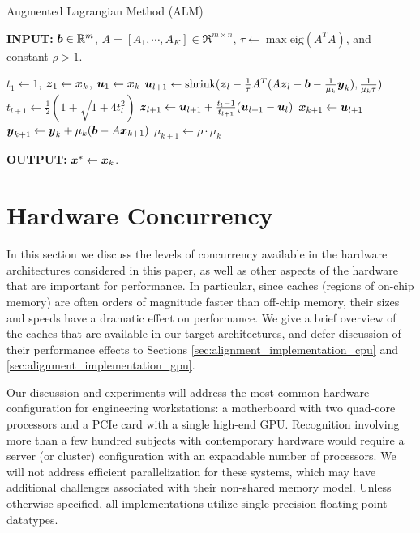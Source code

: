 \documentclass[preprint]{sigplanconf}
\begin{document}
 \begin{algorithm}[h]
\caption{Augmented Lagrangian Method (ALM)}
\small
{\bf INPUT:} ${\boldsymbol{b}} \in {\mathbb{R}}^m$, $A=[A_1,\cdots, A_K] \in \Re^{m \times n}$, $\tau\leftarrow \max\mbox{eig}(A^TA)$, and constant $\rho>1$.
\begin{algorithmic}[1]
\STATE $t_1 \leftarrow 1$, ${\boldsymbol{z}}_1 \leftarrow {\boldsymbol{x}}_k$, ${\boldsymbol{u}}_1 \leftarrow {\boldsymbol{x}}_k$ 
\STATE ${\boldsymbol{u}}_{l+1}  \leftarrow {\text{shrink}}({\boldsymbol{z}}_l - \frac{1}{\tau}A^T(A{\boldsymbol{z}}_l - {\boldsymbol{b}} - \frac{1}{\mu_k}{\boldsymbol{y}}_k), \frac{1}{\mu_k\tau})$
\STATE $t_{l+1} \leftarrow \frac{1}{2}( 1 + \sqrt{1+4t_l^2})$
\STATE ${\boldsymbol{z}}_{l+1} \leftarrow {\boldsymbol{u}}_{l+1}+ \frac{t_l - 1}{t_{l+1}}({\boldsymbol{u}}_{l+1} - {\boldsymbol{u}}_l)$ 
\ENDWHILE 
\STATE ${\boldsymbol{x}}_{k+1} \leftarrow {\boldsymbol{u}}_{l+1}$ 
\STATE ${\boldsymbol{y}}_{k+1} \leftarrow {\boldsymbol{y}}_k + \mu_k ({\boldsymbol{b}} - A{\boldsymbol{x}}_{k+1})$ 
\STATE $\mu_{k+1} \leftarrow \rho\cdot\mu_k$ 
\ENDWHILE 
\end{algorithmic}

{\bf OUTPUT:} ${\boldsymbol{x}}^* \leftarrow {\boldsymbol{x}}_k$.
\label{alg:alm} 
\end{algorithm}

\vspace{-0.06in}
\section{Hardware Concurrency} \label{sec:concurrency}
\vspace{-0.06in}
In this section we discuss the levels of concurrency available in the hardware
architectures considered in this paper, as well as other aspects of the
hardware that are important for performance.  In particular, since caches
(regions of on-chip memory) are often orders of magnitude faster than off-chip
memory, their sizes and speeds have a dramatic effect on performance.  We give a
brief overview of the caches that are available in our target architectures,
and defer discussion of their performance effects to Sections
\ref{sec:alignment_implementation_cpu} and
\ref{sec:alignment_implementation_gpu}.

Our discussion and experiments will address the most common hardware
configuration for engineering workstations: a motherboard with two quad-core
processors and a PCIe card with a single high-end GPU.  
Recognition involving more than a few hundred subjects with contemporary hardware
would require a server (or cluster) configuration with an expandable 
number of processors.  We will not address efficient parallelization for 
these systems, which may have additional challenges associated with
their non-shared memory model.
Unless otherwise specified, all implementations utilize single precision
floating point datatypes.  
\end{document}
